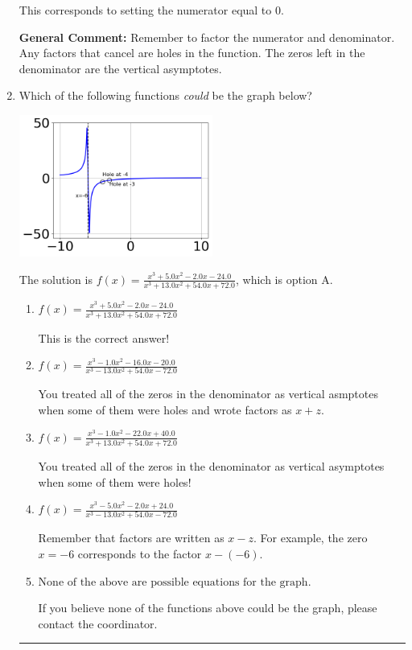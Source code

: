 \documentclass{extbook}[14pt]
\newcommand{\litem}[1]{\item #1

\rule{\textwidth}{0.4pt}}
\begin{document}
\begin{enumerate}
{\begin{enumerate}[label=\Alph*.]
This corresponds to setting the numerator equal to 0.
\end{enumerate}

\textbf{General Comment:} Remember to factor the numerator and denominator. Any factors that cancel are holes in the function. The zeros left in the denominator are the vertical asymptotes.
}
\litem{
Which of the following functions \textit{could} be the graph below?

\begin{center}
    \includegraphics[width=0.5\textwidth]{../Figures/identifyGraphOfRationalFunctionCopyC.png}
\end{center}


The solution is \( f(x)=\frac{x^{3} +5.0 x^{2} -2.0 x -24.0}{x^{3} +13.0 x^{2} +54.0 x + 72.0} \), which is option A.\begin{enumerate}[label=\Alph*.]
\item \( f(x)=\frac{x^{3} +5.0 x^{2} -2.0 x -24.0}{x^{3} +13.0 x^{2} +54.0 x + 72.0} \)

This is the correct answer!
\item \( f(x)=\frac{x^{3} -1.0 x^{2} -16.0 x -20.0}{x^{3} -13.0 x^{2} +54.0 x -72.0} \)

You treated all of the zeros in the denominator as vertical asmptotes when some of them were holes and wrote factors as $x+z$.
\item \( f(x)=\frac{x^{3} -1.0 x^{2} -22.0 x + 40.0}{x^{3} +13.0 x^{2} +54.0 x + 72.0} \)

You treated all of the zeros in the denominator as vertical asymptotes when some of them were holes!
\item \( f(x)=\frac{x^{3} -5.0 x^{2} -2.0 x + 24.0}{x^{3} -13.0 x^{2} +54.0 x -72.0} \)

Remember that factors are written as $x-z$. For example, the zero $x=-6$ corresponds to the factor $x-(-6)$.
\item \( \text{None of the above are possible equations for the graph.} \)

If you believe none of the functions above could be the graph, please contact the coordinator.
\end{enumerate}

}
\end{enumerate}
\end{document}
